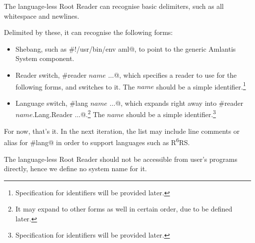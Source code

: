 The language-less Root Reader can recognise basic delimiters, such as all whitespace and newlines. 

Delimited by these, it can recognise the following forms:

\begin{itemize}
  \item Shebang, such as \lstinline@#!/usr/bin/env aml@, to point to the generic Amlantis System component.
  \item Reader switch, \lstinline@#reader $name$ $\ldots$@, which specifies a reader to use for the following forms, and switches to it. The $name$ should be a simple identifier.\footnote{Specification for identifiers will be provided later.}
  \item Language switch, \lstinline@#lang $name$ $\ldots$@, which expands right away into \lstinline@#reader $name$.Lang.Reader $\ldots$@.\footnote{It may expand to other forms as well in certain order, due to be defined later.} The $name$ should be a simple identifier.\footnote{Specification for identifiers will be provided later.}
\end{itemize}


For now, that's it. In the next iteration, the list may include line comments or alias for \lstinline@#lang@ in order to support languages such as R\textsuperscript{6}RS.

The language-less Root Reader should not be accessible from user's programs directly, hence we define no system name for it.





